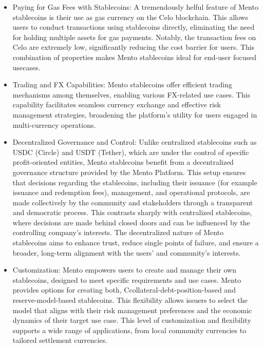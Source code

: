 \documentclass[a4paper]{article}
\theoremstyle{definition}
\begin{document}
\begin{itemize}
    \item Paying for Gas Fees with Stablecoins: A tremendously helful feature of Mento stablecoins is their use as gas currency on the Celo blockchain. This allows users to conduct transactions using stablecoins directly, eliminating the need for holding multiple assets for gas payments. Notably, the transaction fees on Celo are extremely low, significantly reducing the cost barrier for users. This combination of properties makes Mento stablecoins ideal for end-user focused usecases.
    
    \item Trading and FX Capabilities: Mento stablecoins offer efficient trading mechanisms among themselves, enabling various FX-related use cases. This capability facilitates seamless currency exchange and effective risk management strategies, broadening the platform's utility for users engaged in multi-currency operations.
    
    \item Decentralized Governance and Control: Unlike centralized stablecoins such as USDC (Circle) and USDT (Tether), which are under the control of specific profit-oriented entities, Mento stablecoins benefit from a decentralized governance structure provided by the Mento Platform. This setup ensures that decisions regarding the stablecoins, including their issuance (for example issuance and redemption fees), management, and operational protocols, are made collectively by the community and stakeholders through a transparent and democratic process. This contrasts sharply with centralized stablecoins, where decisions are made behind closed doors and can be influenced by the controlling company's interests. The decentralized nature of Mento stablecoins aims to enhance trust, reduce single points of failure, and ensure a broader, long-term alignment with the users' and community's interests.
    
    \item Customization: Mento empowers users to create and manage their own stablecoins, designed to meet specific requirements and use cases. Mento provides options for creating both, Ccollateral-debt-position-based and reserve-model-based stablecoins. This flexibility allows issuers to select the model that aligns with their risk management preferences and the economic dynamics of their target use case. This level of customization and flexibility supports a wide range of applications, from local community currencies to tailored settlement currencies.
    

\end{itemize}
\end{document}
